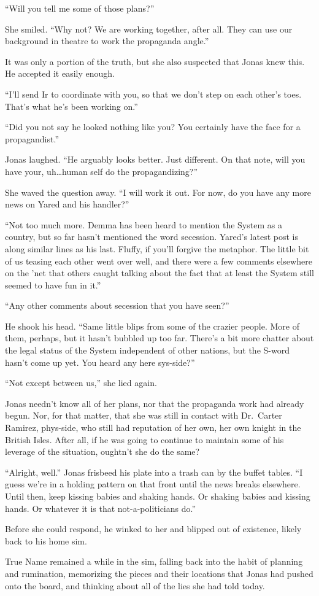``Will you tell me some of those plans?''

She smiled. ``Why not? We are working together, after all. They can use our background in theatre to work the propaganda angle.''

It was only a portion of the truth, but she also suspected that Jonas knew this. He accepted it easily enough.

``I'll send Ir to coordinate with you, so that we don't step on each other's toes. That's what he's been working on.''

``Did you not say he looked nothing like you? You certainly have the face for a propagandist.''

Jonas laughed. ``He arguably looks better. Just different. On that note, will you have your, uh\ldots human self do the propagandizing?''

She waved the question away. ``I will work it out. For now, do you have any more news on Yared and his handler?''

``Not too much more. Demma has been heard to mention the System as a country, but so far hasn't mentioned the word secession. Yared's latest post is along similar lines as his last. Fluffy, if you'll forgive the metaphor. The little bit of us teasing each other went over well, and there were a few comments elsewhere on the 'net that others caught talking about the fact that at least the System still seemed to have fun in it.''

``Any other comments about secession that you have seen?''

He shook his head. ``Same little blips from some of the crazier people. More of them, perhaps, but it hasn't bubbled up too far. There's a bit more chatter about the legal status of the System independent of other nations, but the S-word hasn't come up yet. You heard any here sys-side?''

``Not except between us,'' she lied again.

Jonas needn't know all of her plans, nor that the propaganda work had already begun. Nor, for that matter, that she was still in contact with Dr.~Carter Ramirez, phys-side, who still had reputation of her own, her own knight in the British Isles. After all, if he was going to continue to maintain some of his leverage of the situation, oughtn't she do the same?

``Alright, well.'' Jonas frisbeed his plate into a trash can by the buffet tables. ``I guess we're in a holding pattern on that front until the news breaks elsewhere. Until then, keep kissing babies and shaking hands. Or shaking babies and kissing hands. Or whatever it is that not-a-politicians do.''

Before she could respond, he winked to her and blipped out of existence, likely back to his home sim.

True Name remained a while in the sim, falling back into the habit of planning and rumination, memorizing the pieces and their locations that Jonas had pushed onto the board, and thinking about all of the lies she had told today.
